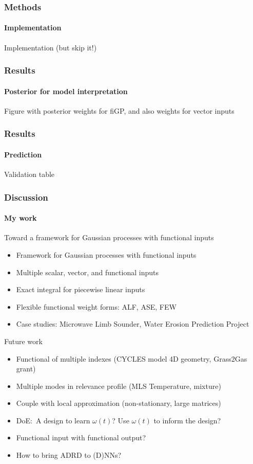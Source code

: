 \documentclass{snedecorbeamer}
\begin{document}
\begin{frame}
  \frametitle{Methods}
  \framesubtitle{Implementation}

  Implementation (but skip it!)
\end{frame}

\begin{frame}
  \frametitle{Results}
  \framesubtitle{Posterior for model interpretation}

  Figure with posterior weights for fiGP, and also weights for vector inputs
\end{frame}

\begin{frame}
  \frametitle{Results}
  \framesubtitle{Prediction}

  Validation table
\end{frame}

\begin{frame}
  \frametitle{Discussion}
  \framesubtitle{My work}

  Toward a framework for Gaussian processes with functional inputs
  \begin{itemize}
  \item Framework for Gaussian processes with functional inputs
  \item Multiple scalar, vector, and functional inputs
  \item Exact integral for piecewise linear inputs
  \item Flexible functional weight forms: ALF, ASE, FEW
  \item Case studies: Microwave Limb Sounder, Water Erosion Prediction Project
  \end{itemize}
  \vspace{3ex}
  Future work
  \begin{itemize}
  \item Functional of multiple indexes (CYCLES model 4D geometry, Grass2Gas
    grant)
  \item Multiple modes in relevance profile (MLS Temperature, mixture)
  \item Couple with local approximation (non-stationary, large matrices)
  \item DoE:~A design to learn $\omega(t)$? Use $\omega(t)$ to inform the
design?
  \item Functional input with functional output?
  \item How to bring ADRD to (D)NNs?
  \end{itemize}
\end{frame}
\end{document}
